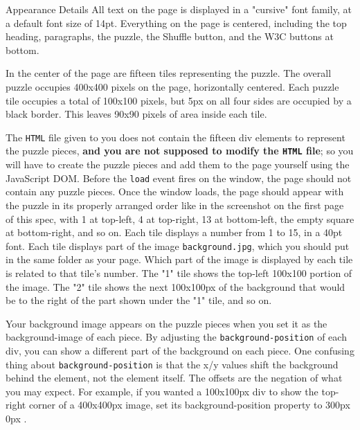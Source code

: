 \documentclass[programming]{../../../../mfcs}
\begin{document}
\begin{question}{Appearance Details}
All text on the page is displayed in a "cursive" font family, at a default font size of 14pt. Everything on the page is
centered, including the top heading, paragraphs, the puzzle, the Shuffle button, and the W3C buttons at bottom.
\newline

In the center of the page are fifteen tiles representing the puzzle. The overall puzzle occupies 400x400 pixels on
the page, horizontally centered. Each puzzle tile occupies a total of 100x100 pixels, but 5px on all four sides are
  occupied by a black border. This leaves 90x90 pixels of area inside each tile.\newline

  The \texttt{HTML} file given to you does not
  contain the fifteen div elements to represent the puzzle pieces, \textbf{and you are not supposed to modify
  the \texttt{HTML} file};
so you will have to create the puzzle pieces and add them to the page yourself using the JavaScript DOM. Before the
  \texttt{load} event fires on the window, the page should not contain any puzzle pieces. Once the window loads,
the page should appear with the puzzle in its properly arranged order like in the screenshot on the first page of this
spec, with 1 at top-left, 4 at top-right, 13 at bottom-left, the empty square at bottom-right, and so on.
Each tile displays a number from 1 to 15, in a 40pt font. Each tile displays part of the image
  \texttt{background.jpg}, which
you should put in the same folder as your page. Which part of the image is displayed by each tile is related to that
tile's number. The "1" tile shows the top-left 100x100 portion of the image. The "2" tile shows the next 100x100px
of the background that would be to the right of the part shown under the "1" tile, and so on.
\newline

Your background image appears on the puzzle pieces when you set it as the background-image of each
  piece. By adjusting the \texttt{background-position} of each div, you can show a different part of the background on each
  piece. One confusing thing about \texttt{background-position} is that the x/y values shift the background behind the
element, not the element itself. The offsets are the negation of what you may expect. For example, if you wanted a
100x100px div to show the top-right corner of a 400x400px image, set its background-position property to 300px 0px . 
\newline


\end{question}
\end{document}
